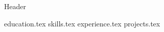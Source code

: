 {Header}


\makecvheader
\vspace{10pt}

{education.tex}
\vspace{4pt}
{skills.tex}
\vspace{4pt}
{experience.tex}
\vspace{4pt}
{projects.tex}


